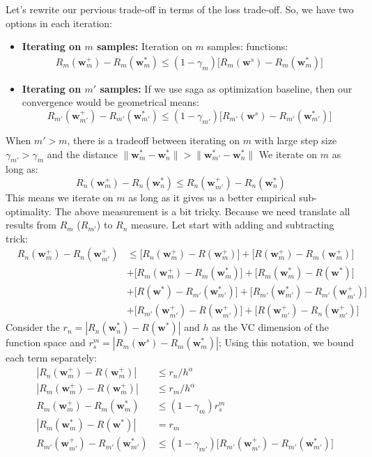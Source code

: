 \documentclass[11pt, a4paper, reqno, twoside]{scrartcl}
\theoremstyle{style}
\newcommand{\wv}{\bm{w}}
\newcommand{\0}{\mathbf{0}} %
\begin{document}
Let's rewrite our pervious trade-off in terms of the loss trade-off. So, we have
two options in each iteration:
\begin{itemize}
  
  \item \textbf{Iterating on $m$ samples:} Iteration on $m$ samples:
  functions: 
  \begin{eqnarray*}
 	  R_m(\wv^+_m) - R_m(\wv^*_m) \leq  (1-\gamma_m)\bigg[
 	  R_m(\wv^s) - R_m(\wv^*_m) \bigg]
  \end{eqnarray*}
  \item \textbf{Iterating on $m'$ samples:} If we use saga as optimization
  baseline, then our convergence would be geometrical means: 
  \begin{equation*}
  		R_{m'}(\wv^+_{m'}) - R_{m'}(\wv^*_{m'}) \leq (1-\gamma_{m'})
  		\bigg[R_{m'}(\wv^s) - R_{m'}(\wv^*_{m'})\bigg]
  \end{equation*}
\end{itemize}
When $m'>m$, there is a tradeoff between iterating on $m$ with large step size
$\gamma_{m'}>\gamma_{m}$ and the distance $\| \wv_m^* -\wv_n^*\| >
\|\wv_{m'}^*-\wv_n^*\|$ We iterate on $m$ as long as:
\begin{equation*}
	R_n(\wv^+_m) - R_n(\wv^*_n) \leq R_n(\wv^+_{m'}) - R_n(\wv^*_n)  
\end{equation*}
This means we iterate on $m$ as long as it gives us a better empirical
sub-optimality. The above measurement is a bit tricky.
Because we need translate all results from $R_m$ ($R_{m'}$) to $R_n$
measure. Let start with adding and subtracting trick: 
\begin{eqnarray*}
	& R_n(\wv^+_m) - R_n(\wv^+_{m'})  & \leq \bigg[R_n(\wv^+_m) - R(\wv^+_m)\bigg]
	+ \bigg[R(\wv^+_m) - R_m(\wv^+_m)\bigg]  \\
	& & + \bigg[R_m(\wv^+_m) - R_m(\wv^*_m)\bigg] + \bigg[R_m(\wv^*_m) -
	R(\wv^*)\bigg] \\ 
	& & + \bigg[R(\wv^*) - R_{m'}(\wv^*_{m'})\bigg] +
	\bigg[R_{m'}(\wv^*_{m'})-R_{m'}(\wv^+_{m'}) \bigg] \\
	& & + \bigg[R_{m'}(\wv^+_{m'}) - R(\wv^+_{m'}) \bigg]
	+ \bigg[R(\wv^+_{m'}) - R_n(\wv^+_{m'}) \bigg]
\end{eqnarray*}
Consider the $r_n = | R_n(\wv^*_n) - R(\wv^*) |$ and $h$ as the VC dimension
of the function space and $r_s^m = |R_m(\wv^s) -
	R_m(\wv^*_m)|$; Using this notation, we bound each term separately: 
\begin{eqnarray*}
	& |R_n(\wv^+_m) - R(\wv^+_m)| & \leq r_n/h^\alpha \\
	& |R_m(\wv^+_m) - R(\wv^+_m)| &  \leq r_m/h^\alpha \\ 
	& R_m(\wv^+_m) - R_m(\wv^*_m) & \leq (1-\gamma_m) r_s^m\\ 
	& |R_m(\wv^*_m) - R(\wv^*)| & = r_m \\  
	& R_{m'}(\wv^+_{m'}) - R_{m'}(\wv^*_{m'})  & \leq (1-\gamma_{m'})
	\bigg[R_{m'}(\wv^+_{m'}) - R_{m'}(\wv^*_{m'}) \bigg]
\end{eqnarray*}
\end{document}
